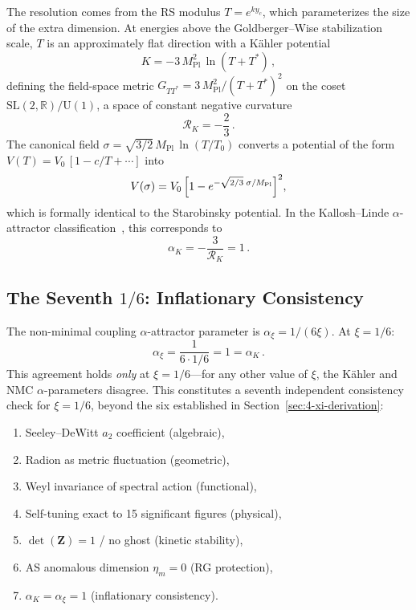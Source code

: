 The resolution comes from the RS modulus $T = e^{ky_c}$, which parameterizes the size of the extra dimension. At energies above the Goldberger--Wise stabilization scale, $T$ is an approximately flat direction with a K\"ahler potential
\begin{equation}
  K = -3\, M_{\mathrm{Pl}}^2\, \ln(T + T^*)\,,
  \label{eq:4-94}
\end{equation}
defining the field-space metric $G_{TT^*} = 3\, M_{\mathrm{Pl}}^2/(T + T^*)^2$ on the coset $\mathrm{SL}(2,\mathbb{R})/\mathrm{U}(1)$, a space of constant negative curvature
\begin{equation}
  \mathcal{R}_K = -\frac{2}{3}\,.
  \label{eq:4-95}
\end{equation}
The canonical field $\sigma = \sqrt{3/2}\, M_{\mathrm{Pl}}\, \ln(T/T_0)$ converts a potential of the form $V(T) = V_0\, [1 - c/T + \cdots]$ into
\begin{equation}
  V(\sigma) = V_0\, \Bigl[1 - e^{-\sqrt{2/3}\;\sigma/M_{\mathrm{Pl}}}\Bigr]^2,
  \label{eq:4-96}
\end{equation}
which is formally identical to the Starobinsky potential. In the Kallosh--Linde $\alpha$-attractor classification~\cite{ch4:KalloshLinde2013}, this corresponds to
\begin{equation}
  \alpha_K = -\frac{3}{\mathcal{R}_K} = 1\,.
  \label{eq:4-97}
\end{equation}

\subsection{The Seventh $1/6$: Inflationary Consistency}
\label{sec:4-seventh-one-sixth}

The non-minimal coupling $\alpha$-attractor parameter is $\alpha_\xi = 1/(6\xi)$. At $\xi = 1/6$:
\begin{equation}
  \alpha_\xi = \frac{1}{6 \cdot 1/6} = 1 = \alpha_K\,.
  \label{eq:4-98}
\end{equation}
This agreement holds \emph{only} at $\xi = 1/6$---for any other value of $\xi$, the K\"ahler and NMC $\alpha$-parameters disagree. This constitutes a seventh independent consistency check for $\xi = 1/6$, beyond the six established in Section~\ref{sec:4-xi-derivation}:
\begin{enumerate}
  \item Seeley--DeWitt $a_2$ coefficient (algebraic),
  \item Radion as metric fluctuation (geometric),
  \item Weyl invariance of spectral action (functional),
  \item Self-tuning exact to 15 significant figures (physical),
  \item $\det(\mathbf{Z}) = 1$ / no ghost (kinetic stability),
  \item AS anomalous dimension $\eta_m = 0$ (RG protection),
  \item $\alpha_K = \alpha_\xi = 1$ (inflationary consistency).
\end{enumerate}


